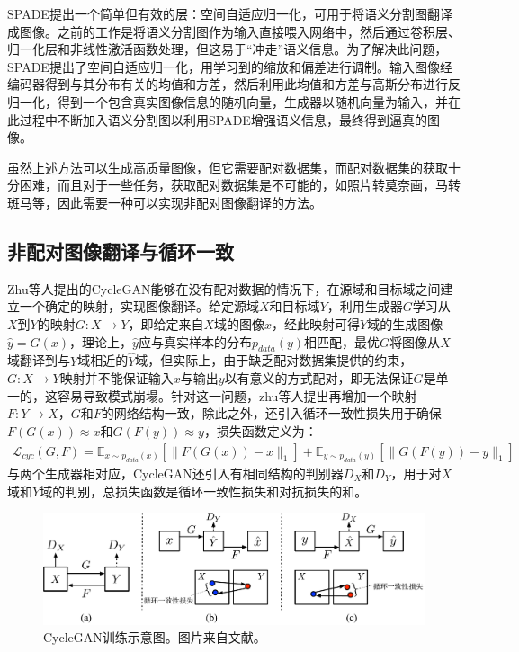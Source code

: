SPADE\cite{park2019semantic}提出一个简单但有效的层：空间自适应归一化，可用于将语义分割图翻译成图像。之前的工作是将语义分割图作为输入直接喂入网络中，然后通过卷积层、归一化层和非线性激活函数处理，但这易于“冲走”语义信息。为了解决此问题，SPADE提出了空间自适应归一化，用学习到的缩放和偏差进行调制。输入图像经编码器得到与其分布有关的均值和方差，然后利用此均值和方差与高斯分布进行反归一化，得到一个包含真实图像信息的随机向量，生成器以随机向量为输入，并在此过程中不断加入语义分割图以利用SPADE增强语义信息，最终得到逼真的图像。

虽然上述方法可以生成高质量图像，但它需要配对数据集，而配对数据集的获取十分困难，而且对于一些任务，获取配对数据集是不可能的，如照片转莫奈画，马转斑马等，因此需要一种可以实现非配对图像翻译的方法。

\subsection{非配对图像翻译与循环一致}

Zhu等人\cite{zhu2017unpaired}提出的CycleGAN能够在没有配对数据的情况下，在源域和目标域之间建立一个确定的映射，实现图像翻译。给定源域$X$和目标域$Y$，利用生成器$G$学习从$X$到$Y$的映射$G:X\to Y$，即给定来自$X$域的图像$x$，经此映射可得$Y$域的生成图像$\hat{y}=G(x)$，理论上，$\hat{y}$应与真实样本的分布$p_{data}(y)$相匹配，最优$G$将图像从$X$域翻译到与$Y$域相近的$\hat{Y}$域，但实际上，由于缺乏配对数据集提供的约束，$G:X\to Y$映射并不能保证输入$x$与输出$y$以有意义的方式配对，即无法保证$G$是单一的，这容易导致模式崩塌。针对这一问题，zhu等人提出再增加一个映射$F:Y\to X$，$G$和$F$的网络结构一致，除此之外，还引入循环一致性损失用于确保$F(G(x)) \approx x$和$G(F(y)) \approx y$，损失函数定义为：
\begin{equation}
\begin{split} 
\mathcal{L}_{cyc}(G, F) = \mathbb{E}_{x\sim p_{data}(x)}[\parallel F(G(x)) - x\parallel_1] + \mathbb{E}_{y\sim p_{data}(y)}[\parallel G(F(y)) - y\parallel_1]
\end{split}
\label{eq:pix2pix}
\end{equation}
与两个生成器相对应，CycleGAN还引入有相同结构的判别器$D_X$和$D_Y$，用于对$X$域和$Y$域的判别，总损失函数是循环一致性损失和对抗损失的和。

\begin{figure}[ht]
    \centering
	\includegraphics[width=\textwidth]{figs/cyclegan.pdf}
	\caption{CycleGAN训练示意图。图片来自文献\cite{zhu2017unpaired}。}
	\label{CycleGAN}
\end{figure}

